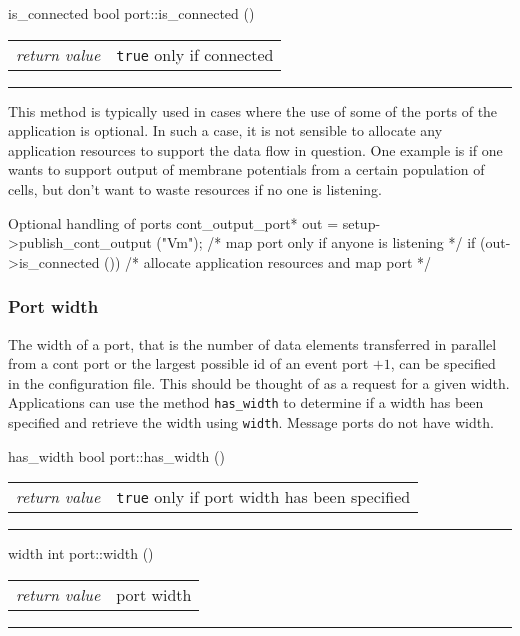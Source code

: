\documentclass[a4paper]{report}
\makeatletter
\newenvironment{parameters}%
{\begin{tabular}{@{\hspace{2em}}lp{0.6\textwidth}}}%
{\end{tabular}\par\vspace{1mm}\par\hrule\par\vspace{5mm}}
\makeatother
\begin{document}
\begin{head}{is_connected}
  bool port::is_connected ()
\end{head}
\begin{parameters}
  \emph{return value} & \lstinline|true| only if connected\\
\end{parameters}

This method is typically used in cases where the use of some of the
ports of the application is optional.  In such a case, it is not
sensible to allocate any application resources to support the data
flow in question.  One example is if one wants to support output of
membrane potentials from a certain population of cells, but don't want
to waste resources if no one is listening.

\begin{code}{Optional handling of ports}
cont_output_port* out =
   setup->publish_cont_output ("Vm");
/* map port only if anyone is listening */
if (out->is_connected ())
  /* allocate application resources and map port */
\end{code}

\subsubsection{Port width}
\label{sec:width}

The width of a port, that is the number of data
elements transferred in parallel from a cont port or the largest
possible id of an event port $+ 1$, can be specified in the
configuration file.  This should be thought of as a request for a
given width.  Applications can use the method \lstinline|has_width| to
determine if a width has been specified and retrieve the width using
\lstinline|width|.  Message ports do not have width.

\begin{head}{has_width}
  bool port::has_width ()
\end{head}
\begin{parameters}
  \emph{return value} & \lstinline|true| only if port width has been
                         specified \\
\end{parameters}

\begin{head}{width}
  int port::width ()
\end{head}
\begin{parameters}
  \emph{return value} & port width \\
\end{parameters}
\end{document}
